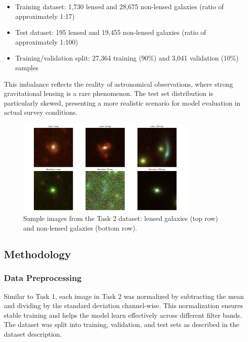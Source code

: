 \documentclass[11pt,a4paper]{article}
\begin{document}
\begin{itemize}
    \item Training dataset: 1,730 lensed and 28,675 non-lensed galaxies (ratio of approximately 1:17)
    \item Test dataset: 195 lensed and 19,455 non-lensed galaxies (ratio of approximately 1:100)
    \item Training/validation split: 27,364 training (90\%) and 3,041 validation (10\%) samples
\end{itemize}

This imbalance reflects the reality of astronomical observations, where strong gravitational lensing is a rare phenomenon. The test set distribution is particularly skewed, presenting a more realistic scenario for model evaluation in actual survey conditions.

\begin{figure}[H]
    \centering
    \includegraphics[width=0.8\textwidth]{../Task2/results/sample_images.png}
    \caption{Sample images from the Task 2 dataset: lensed galaxies (top row) and non-lensed galaxies (bottom row).}
    \label{fig:sample_images}
\end{figure}

\subsection{Methodology}

\subsubsection{Data Preprocessing}
Similar to Task 1, each image in Task 2 was normalized by subtracting the mean and dividing by the standard deviation channel-wise. This normalization ensures stable training and helps the model learn effectively across different filter bands. The dataset was split into training, validation, and test sets as described in the dataset description.
\end{document}
